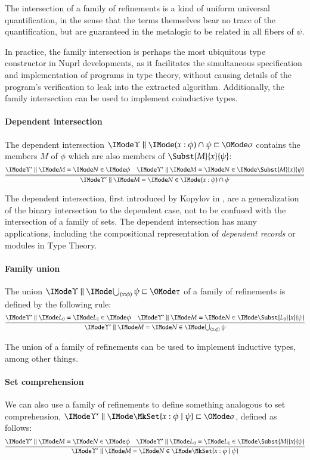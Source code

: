 \documentclass[11pt]{article}
\theoremstyle{definition}
\theoremstyle{notation}
\theoremstyle{remark}
\numberwithin{equation}{section}
\begin{document}
The intersection of a family of refinements is a kind of uniform universal
quantification, in the sense that the terms themselves bear no trace of the
quantification, but are guaranteed in the metalogic to be related in all fibers
of $\psi$.

In practice, the family intersection is perhaps the most ubiquitous type
constructor in Nuprl developments, as it facilitates the simultaneous
specification and implementation of programs in type theory, without causing
details of the program's verification to leak into the extracted algorithm.
Additionally, the family intersection can be used to implement coinductive
types.

\paragraph{Dependent intersection}
The dependent intersection $\Refines{\Upsilon}{(x:\phi)\cap\psi}{\sigma}$
contains the members $M$ of $\phi$ which are also members of
$\Subst{M}{x}{\psi}$:
\[
  \infer={
    \RMemEq{\Upsilon'}{M}{N}{
      (x:\phi)\cap\psi
    }
  }{
    \RMemEq{\Upsilon'}{M}{N}{\phi} &
    \RMemEq{\Upsilon'}{M}{N}{
      \Subst{M}{x}{\psi}
    }
  }
\]

The dependent intersection, first introduced by Kopylov in \cite{kopylov:2000},
are a generalization of the binary intersection to the dependent case, not to
be confused with the intersection of a family of sets. The dependent
intersection has many applications, including the compositional representation
of \emph{dependent records} or modules in Type Theory.

\paragraph{Family union}
The union $\Refines{\Upsilon}{\bigcup_{(x:\phi)}\psi}{\tau}$ of a family of
refinements is defined by the following rule:
\[
  \infer{
    \RMemEq{\Upsilon'}{M}{N}{
      \bigcup_{(x:\phi)}\psi
    }
  }{
    \RMemEq{\Upsilon'}{L_0}{L_1}{\phi} &
    \RMemEq{\Upsilon'}{M}{N}{
      \Subst{L_0}{x}{\psi}
    }
  }
\]

The union of a family of refinements can be used to implement inductive types,
among other things.

\paragraph{Set comprehension}

We can also use a family of refinements to define something analogous to set
comprehension, $\Refines{\Upsilon'}{\MkSet{x:\phi\mid\psi}}{\sigma}$, defined
as follows:
\[
  \infer{
    \RMemEq{\Upsilon'}{M}{N}{
      \MkSet{x:\phi\mid\psi}
    }
  }{
    \RMemEq{\Upsilon'}{M}{N}{\phi} &
    \RMemEq{\Upsilon'}{L_0}{L_1}{
      \Subst{M}{x}{\psi}
    }
  }
\]
\end{document}
